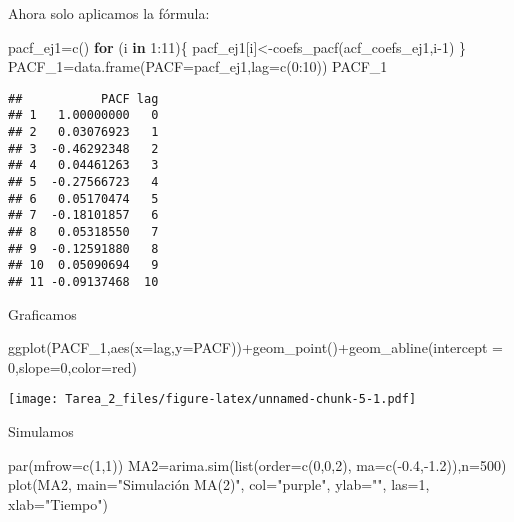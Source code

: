 \documentclass[
]{article}
\newenvironment{Shaded}{\begin{snugshade}}{\end{snugshade}}
\newcommand{\AttributeTok}[1]{\textcolor[rgb]{0.77,0.63,0.00}{#1}}
\newcommand{\ControlFlowTok}[1]{\textcolor[rgb]{0.13,0.29,0.53}{\textbf{#1}}}
\newcommand{\DecValTok}[1]{\textcolor[rgb]{0.00,0.00,0.81}{#1}}
\newcommand{\FloatTok}[1]{\textcolor[rgb]{0.00,0.00,0.81}{#1}}
\newcommand{\FunctionTok}[1]{\textcolor[rgb]{0.00,0.00,0.00}{#1}}
\newcommand{\NormalTok}[1]{#1}
\newcommand{\OtherTok}[1]{\textcolor[rgb]{0.56,0.35,0.01}{#1}}
\newcommand{\SpecialCharTok}[1]{\textcolor[rgb]{0.00,0.00,0.00}{#1}}
\newcommand{\StringTok}[1]{\textcolor[rgb]{0.31,0.60,0.02}{#1}}
\begin{document}
Ahora solo aplicamos la fórmula:

\begin{Shaded}
\begin{Highlighting}[]
\NormalTok{pacf\_ej1}\OtherTok{=}\FunctionTok{c}\NormalTok{()}
\ControlFlowTok{for}\NormalTok{ (i }\ControlFlowTok{in} \DecValTok{1}\SpecialCharTok{:}\DecValTok{11}\NormalTok{)\{}
\NormalTok{  pacf\_ej1[i]}\OtherTok{\textless{}{-}}\FunctionTok{coefs\_pacf}\NormalTok{(acf\_coefs\_ej1,i}\DecValTok{{-}1}\NormalTok{)}
\NormalTok{\}}
\NormalTok{PACF\_1}\OtherTok{=}\FunctionTok{data.frame}\NormalTok{(}\AttributeTok{PACF=}\NormalTok{pacf\_ej1,}\AttributeTok{lag=}\FunctionTok{c}\NormalTok{(}\DecValTok{0}\SpecialCharTok{:}\DecValTok{10}\NormalTok{))}
\NormalTok{PACF\_1}
\end{Highlighting}
\end{Shaded}

\begin{verbatim}
##           PACF lag
## 1   1.00000000   0
## 2   0.03076923   1
## 3  -0.46292348   2
## 4   0.04461263   3
## 5  -0.27566723   4
## 6   0.05170474   5
## 7  -0.18101857   6
## 8   0.05318550   7
## 9  -0.12591880   8
## 10  0.05090694   9
## 11 -0.09137468  10
\end{verbatim}

Graficamos

\begin{Shaded}
\begin{Highlighting}[]
\FunctionTok{ggplot}\NormalTok{(PACF\_1,}\FunctionTok{aes}\NormalTok{(}\AttributeTok{x=}\NormalTok{lag,}\AttributeTok{y=}\NormalTok{PACF))}\SpecialCharTok{+}\FunctionTok{geom\_point}\NormalTok{()}\SpecialCharTok{+}\FunctionTok{geom\_abline}\NormalTok{(}\AttributeTok{intercept =} \DecValTok{0}\NormalTok{,}\AttributeTok{slope=}\DecValTok{0}\NormalTok{,}\AttributeTok{color=}\StringTok{\textquotesingle{}red\textquotesingle{}}\NormalTok{)}
\end{Highlighting}
\end{Shaded}

\texttt{[image: Tarea\_2\_files/figure-latex/unnamed-chunk-5-1.pdf]}

Simulamos

\begin{Shaded}
\begin{Highlighting}[]
\FunctionTok{par}\NormalTok{(}\AttributeTok{mfrow=}\FunctionTok{c}\NormalTok{(}\DecValTok{1}\NormalTok{,}\DecValTok{1}\NormalTok{))}
\NormalTok{MA2}\OtherTok{=}\FunctionTok{arima.sim}\NormalTok{(}\FunctionTok{list}\NormalTok{(}\AttributeTok{order=}\FunctionTok{c}\NormalTok{(}\DecValTok{0}\NormalTok{,}\DecValTok{0}\NormalTok{,}\DecValTok{2}\NormalTok{), }\AttributeTok{ma=}\FunctionTok{c}\NormalTok{(}\SpecialCharTok{{-}}\FloatTok{0.4}\NormalTok{,}\SpecialCharTok{{-}}\FloatTok{1.2}\NormalTok{)),}\AttributeTok{n=}\DecValTok{500}\NormalTok{)}
\FunctionTok{plot}\NormalTok{(MA2, }\AttributeTok{main=}\StringTok{"Simulación MA(2)"}\NormalTok{, }\AttributeTok{col=}\StringTok{"purple"}\NormalTok{, }\AttributeTok{ylab=}\StringTok{""}\NormalTok{, }\AttributeTok{las=}\DecValTok{1}\NormalTok{, }\AttributeTok{xlab=}\StringTok{"Tiempo"}\NormalTok{)}
\end{Highlighting}
\end{Shaded}
\end{document}

